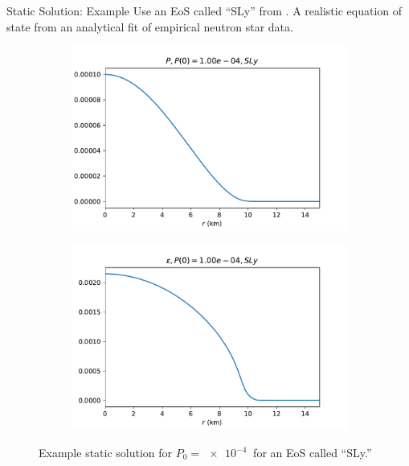 \documentclass[handout]{beamer}
\begin{document}
    \begin{frame}{Static Solution: Example}
        \pause
        Use an EoS called ``SLy'' from \autocite{SLy_2004}. A realistic equation of state from an analytical fit of empirical neutron star data.

        \begin{figure}[h!]
            \centering
            \begin{subfigure}{.5\textwidth}
                \includegraphics[width = \textwidth]{SLy_P,p0_0.0001.pdf}
            \end{subfigure}%
            \begin{subfigure}{.5\textwidth}
                \includegraphics[width = \textwidth]{SLy_rho,p0_0.0001.pdf}
            \end{subfigure}
            \caption[]{Example static solution for $P_0 = \SI{e-4}{}$ for an EoS called ``SLy.''}
        \end{figure}

    \end{frame}
\end{document}
